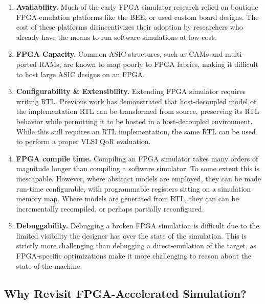 \begin{enumerate}

    \item \textbf{Availability.} Much of the early FPGA simulator research
        relied on boutique FPGA-emulation platforms like the BEE\cite{bee2}, or
        used custom board designs. The cost of these platforms disincentivizes
        their adoption by researchers who already have the means to run
        software simulations at low cost.

    \item \textbf{FPGA Capacity.} Common ASIC structures, such as CAMs and
        multi-ported RAMs, are known to map poorly to FPGA
        fabrics\cite{fpgagap, fpgagap2}, making it difficult to host large
        ASIC designs on an FPGA.

    \item \textbf{Configurability \& Extensibility.} Extending FPGA simulator
        requires writing RTL.
        Previous work\cite{fabscalarfpga, strober} has demonstrated that
        host-decoupled model of the implementation RTL can be transformed from
        source, preserving its RTL behavior while permitting it to be hosted
        in a host-decoupled environment. While this still requires an RTL
        implementation, the same RTL can be used to perform a proper VLSI QoR
        evaluation.

    \item \textbf{FPGA compile time.} Compiling an FPGA simulator takes many
        orders of magnitude longer than compiling a software simulator.
        To some extent this is inescapable. However, where abstract models are
        employed, they can be made run-time configurable, with programmable
        registers sitting on a simulation memory map. Where models are
        generated from RTL, they can can be incrementally recompiled, or perhaps
        partially reconfigured.

    \item \textbf{Debuggability.} Debugging a broken FPGA simulation is
        difficult due to the limited visibility the designer has over the state
        of the simulation. This is strictly more challenging than debugging a
        direct-emulation of the target, as FPGA-specific optimizations make it more
        challenging to reason about the state of the machine.

\end{enumerate}

\subsection{Why Revisit FPGA-Accelerated Simulation?}

